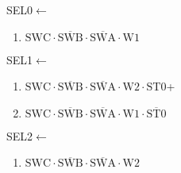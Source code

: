 \documentclass[UTF8]{ctexart}
\begin{document}
SEL0$\leftarrow$
\begin{enumerate}[\indent\indent]
	\item$\text{SWC}\cdot\overline{\text{SWB}}\cdot\overline{\text{SWA}}\cdot\text{W1}$
\end{enumerate}

SEL1$\leftarrow$
\begin{enumerate}[\indent\indent]
	\item$\text{SWC}\cdot\overline{\text{SWB}}\cdot\overline{\text{SWA}}\cdot\text{W2}\cdot\text{ST0}$+
	\item$\text{SWC}\cdot\overline{\text{SWB}}\cdot\overline{\text{SWA}}\cdot\text{W1}\cdot\overline{\text{ST0}}$
\end{enumerate}

SEL2$\leftarrow$
\begin{enumerate}[\indent\indent]
	\item$\text{SWC}\cdot\overline{\text{SWB}}\cdot\overline{\text{SWA}}\cdot\text{W2}$
\end{enumerate}
\end{document}
